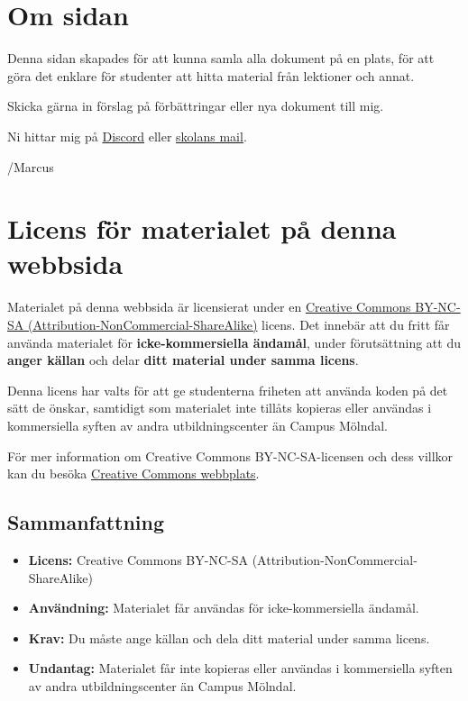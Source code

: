 \hypertarget{om-sidan}{%
\section{Om sidan}\label{om-sidan}}

Denna sidan skapades för att kunna samla alla dokument på en plats, för
att göra det enklare för studenter att hitta material från lektioner och
annat.

Skicka gärna in förslag på förbättringar eller nya dokument till mig.

Ni hittar mig på \href{https://discord.com/users/mrmarcus1337}{Discord}
eller \href{marcus.medina-ramirez@molndal.se}{skolans mail}.

/Marcus

\hypertarget{licens-fuxf6r-materialet-puxe5-denna-webbsida}{%
\section{Licens för materialet på denna
webbsida}\label{licens-fuxf6r-materialet-puxe5-denna-webbsida}}

Materialet på denna webbsida är licensierat under en
\href{https://creativecommons.org/licenses/by-nc-sa/4.0/}{Creative
Commons BY-NC-SA (Attribution-NonCommercial-ShareAlike)} licens. Det
innebär att du fritt får använda materialet för
\textbf{icke-kommersiella ändamål}, under förutsättning att du
\textbf{anger källan} och delar \textbf{ditt material under samma
licens}.

Denna licens har valts för att ge studenterna friheten att använda koden
på det sätt de önskar, samtidigt som materialet inte tillåts kopieras
eller användas i kommersiella syften av andra utbildningscenter än
Campus Mölndal.

För mer information om Creative Commons BY-NC-SA-licensen och dess
villkor kan du besöka
\href{https://creativecommons.org/licenses/by-nc-sa/}{Creative Commons
webbplats}.

\hypertarget{sammanfattning}{%
\subsection{Sammanfattning}\label{sammanfattning}}

\begin{itemize}
\tightlist
\item
  \textbf{Licens:} Creative Commons BY-NC-SA
  (Attribution-NonCommercial-ShareAlike)
\item
  \textbf{Användning:} Materialet får användas för icke-kommersiella
  ändamål.
\item
  \textbf{Krav:} Du måste ange källan och dela ditt material under samma
  licens.
\item
  \textbf{Undantag:} Materialet får inte kopieras eller användas i
  kommersiella syften av andra utbildningscenter än Campus Mölndal.
\end{itemize}

